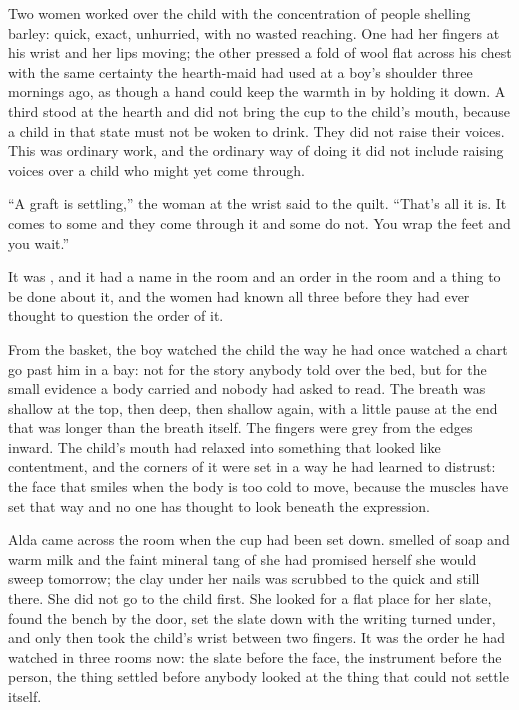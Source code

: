 Two women worked over the child with the concentration of people shelling barley: quick, exact, unhurried, with no wasted reaching. One had her fingers at his wrist and her lips moving; the other pressed a fold of wool flat across his chest with the same certainty the hearth-maid had used at a boy's shoulder three mornings ago, as though a hand could keep the warmth in by holding it down. A third stood at the hearth and did not bring the cup to the child's mouth, because a child in that state must not be woken to drink. They did not raise their voices. This was ordinary work, and the ordinary way of doing it did not include raising voices over a child who might yet come through.

“A graft is settling,” the woman at the wrist said to the quilt. “That's all it is. It comes to some and they come through it and some do not. You wrap the feet and you wait.”

It was , and it had a name in the room and an order in the room and a thing to be done about it, and the women had known all three before they had ever thought to question the order of it.

From the basket, the boy watched the child the way he had once watched a chart go past him in a bay: not for the story anybody told over the bed, but for the small evidence a body carried and nobody had asked to read. The breath was shallow at the top, then deep, then shallow again, with a little pause at the end that was longer than the breath itself. The fingers were grey from the edges inward. The child's mouth had relaxed into something that looked like contentment, and the corners of it were set in a way he had learned to distrust: the face that smiles when the body is too cold to move, because the muscles have set that way and no one has thought to look beneath the expression.

\scenebreak

Alda came across the room when the cup had been set down.  smelled of soap and warm milk and the faint mineral tang of  she had promised herself she would sweep tomorrow; the clay under her nails was scrubbed to the quick and still there. She did not go to the child first. She looked for a flat place for her slate, found the bench by the door, set the slate down with the writing turned under, and only then took the child's wrist between two fingers. It was the order he had watched in three rooms now: the slate before the face, the instrument before the person, the thing settled before anybody looked at the thing that could not settle itself.


